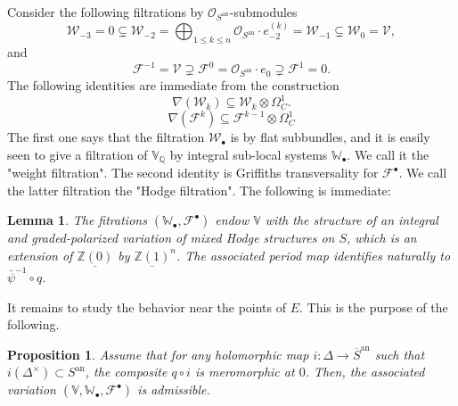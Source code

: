 \documentclass[10pt]{article}
\numberwithin{equation}{subsection}
\theoremstyle{plain}
\newtheorem{lemma}[theorem]{Lemma}
\newtheorem{proposition}[theorem]{Proposition}
\theoremstyle{definition}
\theoremstyle{remark}
\newcommand{\Z}{\mathbb Z}
\newcommand{\Q}{\mathbb Q}
\newcommand{\V}{\mathbb V}
\newcommand{\W}{\mathbb W}
\newcommand{\bul}{\bullet}
\newcommand{\an}{\mathrm{an}}
\begin{document}
Consider the following filtrations by $\mathcal{O}_{S^\an}$-submodules
\[
\mathcal{W}_{-3} = 0 \subsetneq \mathcal{W}_{-2} = \bigoplus_{1 \leqslant k \leqslant n} \mathcal{O}_{S^\an} \cdot e_{-2}^{(k)} = \mathcal{W}_{-1} \subsetneq \mathcal{W}_0 = \mathcal{V},
\]
and
\[
\mathcal{F}^{-1} = \mathcal{V} \supsetneq \mathcal{F}^{0} = \mathcal{O}_{S^\an} \cdot e_0 \supsetneq \mathcal{F}^{1} = 0.
\]
The following identities are immediate from the construction
\[
\nabla(\mathcal{W}_k)  \subseteq \mathcal{W}_{k} \otimes \Omega^1_C.
\] 
\[
\nabla(\mathcal{F}^k)  \subseteq \mathcal{F}^{k-1} \otimes \Omega^1_C
\] 
The first one says that the filtration $\mathcal{W}_\bul$ is by flat subbundles, and it is easily seen to give a filtration of $\V_\Q$ by integral sub-local systems $\W_\bul$. We call it the "weight filtration". The second identity is Griffiths transversality for $\mathcal{F}^\bul$. We call the latter filtration the "Hodge filtration". The following is immediate:
\begin{lemma}
The fitrations $(\W_\bul, \mathcal{F}^\bul)$ endow $\V$ with the structure of an integral and graded-polarized variation of mixed Hodge structures on $S$, which is an extension of $\underline{\Z(0)}$ by $\underline{\Z(1)}^n$. The associated period map identifies naturally to $\bar{\psi}^{-1} \circ q$.
\end{lemma}
It remains to study the behavior near the points of $E$. This is the purpose of the following.
\begin{proposition}
Assume that for any holomorphic map $i : \Delta \rightarrow \overline{S}^\an$ such that $i(\Delta^\times) \subset S^\an$, the composite $q \circ i$ is meromorphic at $0$. Then, the associated variation $(\V, \W_\bul, \mathcal{F}^\bul)$ is admissible.
\end{proposition}
\end{document}
